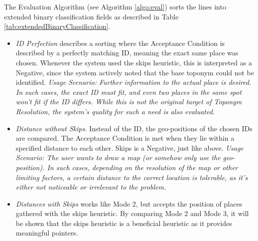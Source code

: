\documentclass[11pt]{article}
\begin{document}
The Evaluation Algorithm (see Algorithm \ref{algo:eval}) sorts the lines into extended binary classification fields as described in Table \ref{tab:extendedBinaryClassification}.


\begin{itemize}
\item[Mode 1:] \emph{ID Perfection} describes a sorting where the Acceptance Condition is described by a perfectly matching ID, meaning the exact same place was chosen. Whenever the system used the skips heuristic, this is interpreted as a Negative, since the system actively noted that the base toponym could not be identified. \emph{Usage Scenario: Further information to the actual place is desired. In such cases, the exact ID must fit, and even two places in the same spot won't fit if the ID differs. While this is not the original target of Toponym Resolution, the system's quality for such a need is also evaluated.}
\item[Mode 2:] \emph{Distance without Skips}. Instead of the ID, the geo-positions of the chosen IDs are compared. The Acceptance Condition is met when they lie within a specified distance to each other. Skips is a Negative, just like above. \emph{Usage Scenario: The user wants to draw a map (or somehow only use the geo-position). In such cases, depending on the resolution of the map or other limiting factors, a certain distance to the correct location is tolerable, as it's either not noticeable or irrelevant to the problem.}
\item[Mode 3:] \emph{Distances with Skips} works like Mode 2, but accepts the position of places gathered with the skips heuristic. By comparing Mode 2 and Mode 3, it will be shown that the skips heuristic is a beneficial heuristic as it provides meaningful pointers.
\end{itemize}
\end{document}
